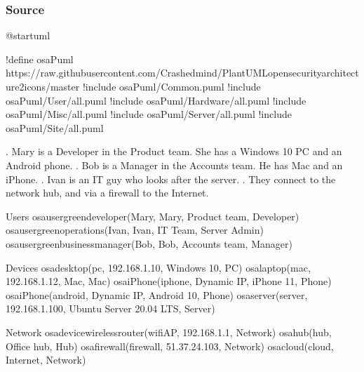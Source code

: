 \documentclass[letterpaper,10pt,english]{sphinxmanual}
\begin{document}
\subsubsection{Source}
\label{\detokenize{NetworkUsersMachines/NetworkUsersMachines:id6}}
%
\begin{sphinxVerbatim}[commandchars=\\\{\},numbers=left,firstnumber=1,stepnumber=1]
@startuml

!define osaPuml https://raw.githubusercontent.com/Crashedmind/PlantUML\PYGZhy{}opensecurityarchitecture2\PYGZhy{}icons/master
!include osaPuml/Common.puml
!include osaPuml/User/all.puml
!include osaPuml/Hardware/all.puml
!include osaPuml/Misc/all.puml
!include osaPuml/Server/all.puml
!include osaPuml/Site/all.puml

\PYGZsq{}. Mary is a Developer in the Product team. She has a Windows 10 PC and an Android phone.
\PYGZsq{}. Bob is a Manager in the Accounts team. He has Mac and an iPhone.
\PYGZsq{}. Ivan is an IT guy who looks after the server. 
\PYGZsq{}. They connect to the network hub, and via a firewall to the Internet.


\PYGZsq{} Users
osa\PYGZus{}user\PYGZus{}green\PYGZus{}developer(Mary, \PYGZdq{}Mary\PYGZdq{}, \PYGZdq{}Product team\PYGZdq{}, \PYGZdq{}Developer\PYGZdq{})
osa\PYGZus{}user\PYGZus{}green\PYGZus{}operations(Ivan, \PYGZdq{}Ivan\PYGZdq{}, \PYGZdq{}IT Team\PYGZdq{}, \PYGZdq{}Server Admin\PYGZdq{})
osa\PYGZus{}user\PYGZus{}green\PYGZus{}business\PYGZus{}manager(Bob, \PYGZdq{}Bob\PYGZdq{}, \PYGZdq{}Accounts team\PYGZdq{}, \PYGZdq{}Manager\PYGZdq{})

\PYGZsq{} Devices
osa\PYGZus{}desktop(pc, \PYGZdq{}192.168.1.10\PYGZdq{}, \PYGZdq{}Windows 10\PYGZdq{}, \PYGZdq{}PC\PYGZdq{})
osa\PYGZus{}laptop(mac, \PYGZdq{}192.168.1.12\PYGZdq{}, \PYGZdq{}Mac\PYGZdq{}, \PYGZdq{}Mac\PYGZdq{})
osa\PYGZus{}iPhone(iphone, \PYGZdq{}Dynamic IP\PYGZdq{}, \PYGZdq{}iPhone 11\PYGZdq{}, \PYGZdq{}Phone\PYGZdq{})
osa\PYGZus{}iPhone(android, \PYGZdq{}Dynamic IP\PYGZdq{}, \PYGZdq{}Android 10\PYGZdq{}, \PYGZdq{}Phone\PYGZdq{})
osa\PYGZus{}server(server, \PYGZdq{}192.168.1.100\PYGZdq{}, \PYGZdq{}Ubuntu Server 20.04 LTS\PYGZdq{}, \PYGZdq{}Server\PYGZdq{})

\PYGZsq{} Network
osa\PYGZus{}device\PYGZus{}wireless\PYGZus{}router(wifiAP, \PYGZdq{}192.168.1.1\PYGZdq{}, \PYGZdq{}Network\PYGZdq{})
osa\PYGZus{}hub(hub, \PYGZdq{}Office hub\PYGZdq{}, \PYGZdq{}Hub\PYGZdq{})
osa\PYGZus{}firewall(firewall, \PYGZdq{}51.37.24.103\PYGZdq{}, \PYGZdq{}Network\PYGZdq{})
osa\PYGZus{}cloud(cloud, \PYGZdq{}Internet\PYGZdq{}, \PYGZdq{}Network\PYGZdq{})


\end{sphinxVerbatim}
\end{document}
